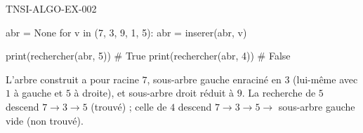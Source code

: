 \begin{corrige}{TNSI-ALGO-EX-002}
\begin{python}
abr = None
for v in (7, 3, 9, 1, 5):
    abr = inserer(abr, v)

print(rechercher(abr, 5))  # True
print(rechercher(abr, 4))  # False
\end{python}
L'arbre construit a pour racine $7$, sous-arbre gauche enraciné en $3$ (lui-même avec $1$ à gauche et $5$ à droite), et sous-arbre droit réduit à $9$. La recherche de $5$ descend $7 \to 3 \to 5$ (trouvé) ; celle de $4$ descend $7 \to 3 \to 5 \to$ sous-arbre gauche vide (non trouvé).
\end{corrige}
